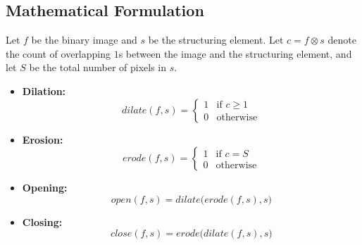 \documentclass[12pt]{article}
\begin{document}
\subsection{Mathematical Formulation}

Let $f$ be the binary image and $s$ be the structuring element. Let $c = f \otimes s$ denote the count of overlapping $1$s between the image and the structuring element, and let $S$ be the total number of pixels in $s$.

\begin{itemize}
    \item \textbf{Dilation:}
          \[
              dilate(f, s) =
              \begin{cases}
                  1 & \text{if } c \ge 1 \\
                  0 & \text{otherwise}
              \end{cases}
          \]

    \item \textbf{Erosion:}
          \[
              erode(f, s) =
              \begin{cases}
                  1 & \text{if } c = S \\
                  0 & \text{otherwise}
              \end{cases}
          \]

    \item \textbf{Opening:}
          \[
              open(f, s) = dilate\big(erode(f, s), s\big)
          \]

    \item \textbf{Closing:}
          \[
              close(f, s) = erode\big(dilate(f, s), s\big)
          \]
\end{itemize}
\end{document}
